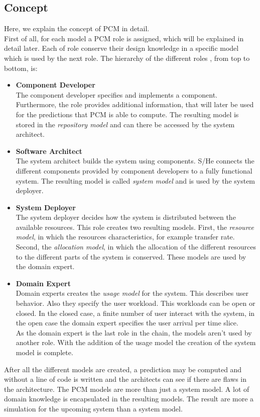 \subsection{Concept}
Here, we explain the concept of PCM in detail. \\
First of all, for each model a PCM role is assigned, which will be explained in detail later. Each of role conserve their design knowledge in a specific model which is used by the next role. The hierarchy of the different roles , from top to bottom, is:
\begin{itemize}
\item \textbf{Component Developer}\\
The component developer specifies and implements a component. Furthermore, the role provides additional information, that will later be used for the predictions that PCM is able to compute. The resulting model is stored in the \textit{repository model} and can there be accessed  by the system architect.
\item \textbf{Software Architect}\\
The system architect builds the system using components. S/He connects the different components provided by component developers to a fully functional system. The resulting model is called \textit{system model} and is used by the system deployer.
\item \textbf{System Deployer}\\
The system deployer decides  how the system is distributed between the available resources. 
This role creates two resulting models. First, the \textit{resource model}, in which the resources characteristics, for example transfer rate. Second, the \textit{allocation model}, in which the allocation of the different resources to the different parts of the system is conserved. These models are used by the domain expert.
\item \textbf{Domain Expert}\\
Domain experts creates the \textit{usage model} for the system. This describes user behavior. Also they specify the user workload. This workloads can be open or closed. In the closed case, a finite number of user interact with the system, in the open case the domain expert specifies the user arrival per time slice.\\
As the domain expert is the last role in the chain, the models aren't used by another role. With the addition of the usage model the creation of the system model is complete.
\end{itemize}
After all the different models are created, a prediction may be computed and without a line of code is written and the architects can see if there are flaws in the architecture. The PCM models are more than just a system model. A lot of domain knowledge is encapsulated in the resulting models. The result are more a simulation for the upcoming system than a system model.
